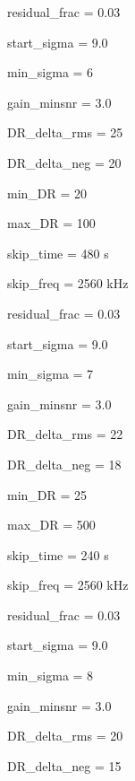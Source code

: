\documentclass[letterpaper,10pt,english]{sphinxmanual}
\begin{document}
\sphinxAtStartPar
residual\_frac   =       0.03

\sphinxAtStartPar
start\_sigma             =       9.0

\sphinxAtStartPar
min\_sigma               =       6

\sphinxAtStartPar
gain\_minsnr             =       3.0

\sphinxAtStartPar
DR\_delta\_rms    =       25

\sphinxAtStartPar
DR\_delta\_neg    =       20

\sphinxAtStartPar
min\_DR                  =       20

\sphinxAtStartPar
max\_DR                  =       100

\sphinxAtStartPar
skip\_time               =       480 s

\sphinxAtStartPar
skip\_freq               =       2560 kHz

\sphinxAtStartPar
{}

\sphinxAtStartPar
residual\_frac   =       0.03

\sphinxAtStartPar
start\_sigma             =       9.0

\sphinxAtStartPar
min\_sigma               =       7

\sphinxAtStartPar
gain\_minsnr             =       3.0

\sphinxAtStartPar
DR\_delta\_rms    =       22

\sphinxAtStartPar
DR\_delta\_neg    =       18

\sphinxAtStartPar
min\_DR                  =       25

\sphinxAtStartPar
max\_DR                  =       500

\sphinxAtStartPar
skip\_time               =       240 s

\sphinxAtStartPar
skip\_freq               =       2560 kHz

\sphinxAtStartPar
{}

\sphinxAtStartPar
residual\_frac   =       0.03

\sphinxAtStartPar
start\_sigma             =       9.0

\sphinxAtStartPar
min\_sigma               =       8

\sphinxAtStartPar
gain\_minsnr             =       3.0

\sphinxAtStartPar
DR\_delta\_rms    =       20

\sphinxAtStartPar
DR\_delta\_neg    =       15
\end{document}

